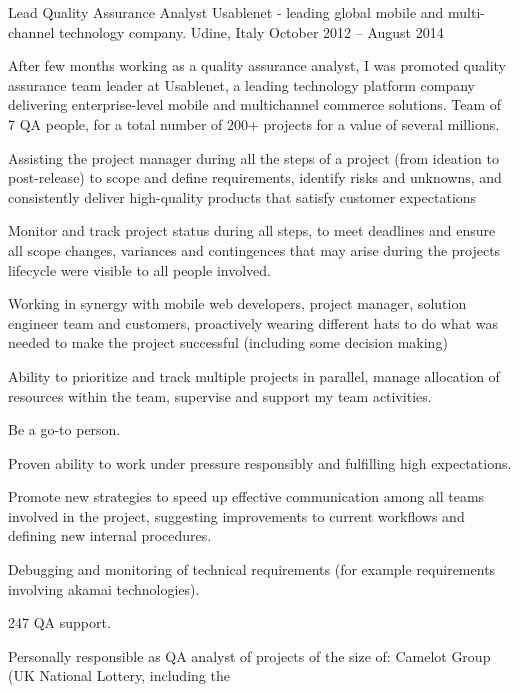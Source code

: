 \begin{cventries}
\cventry
{Lead Quality Assurance Analyst} 
{Usablenet - leading global mobile and multi-channel technology company.}
   {Udine, Italy}
{October 2012 -- August 2014}
   {
	\begin{cvitems}
	\item After few months working as a quality assurance analyst, I was
      promoted 
   quality assurance team leader at Usablenet, a leading 
  technology platform  company delivering enterprise-level mobile and
  multichannel commerce solutions. Team of 7 QA people, for a total number of 200+ projects for a value of several millions. 
\item 
  Assisting the project manager during all the steps of a project (from ideation to post-release)
    to scope and define requirements, identify risks and unknowns, and 
   consistently deliver high-quality
   products that satisfy customer expectations 
\item Monitor and track project status during all steps, to meet deadlines
   and ensure all scope changes,
 variances and contingences that may arise during the 
 projects lifecycle were visible to all people involved.
    \item 
  Working in synergy with mobile web
    developers, project manager, solution engineer team and customers, proactively wearing different hats to do what was needed to make the project successful (including some decision making)
 \item 
   Ability to prioritize and track multiple projects in parallel,
    manage  allocation of resources within the team, supervise and support my team
    activities.
 \item  Be a go-to person.
 \item 
   Proven ability to work under pressure responsibly and fulfilling high
   expectations.
\item Promote new strategies to speed up effective communication among all
   teams involved in the project, suggesting 
   improvements to current workflows and defining new internal procedures.
\item Debugging and monitoring of %
technical requirements (for example requirements involving
   akamai technologies).
\item 247 QA support.
   \item Personally responsible as QA analyst of projects of the size of:
   Camelot Group (UK National Lottery, including the

\end{cvitems}}
\end{cventries}
